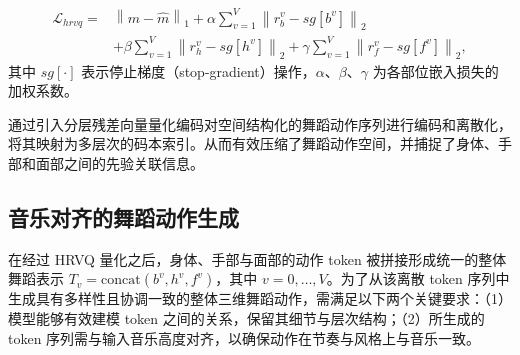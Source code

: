 \begin{equation}
\begin{aligned}
    \mathcal{L}_{hrvq} = & \left \| m - \hat{m} \right \|_1 + \alpha \sum_{v=1}^{V}\left \| r^v_b - sg[b^v] \right \|_2 \\
& + \beta \sum_{v=1}^{V}\left \| r^v_h - sg[h^v] \right \|_2 + \gamma \sum_{v=1}^{V}\left \| r^v_f - sg[f^v] \right \|_2 ,
\end{aligned}
\label{eq:hrvq_loss}
\end{equation}
其中 $sg[\cdot]$ 表示停止梯度（stop-gradient）操作，$\alpha$、$\beta$、$\gamma$ 为各部位嵌入损失的加权系数。

通过引入分层残差向量量化编码对空间结构化的舞蹈动作序列进行编码和离散化，将其映射为多层次的码本索引。从而有效压缩了舞蹈动作空间，并捕捉了身体、手部和面部之间的先验关联信息。

\subsection{音乐对齐的舞蹈动作生成}
\label{subsec:magm}
在经过 HRVQ 量化之后，身体、手部与面部的动作 token 被拼接形成统一的整体舞蹈表示 $T_v = \text{concat}(b^v, h^v, f^v)$，其中 $v=0, \dots, V$。为了从该离散 token 序列中生成具有多样性且协调一致的整体三维舞蹈动作，需满足以下两个关键要求：（1）模型能够有效建模 token 之间的关系，保留其细节与层次结构；（2）所生成的 token 序列需与输入音乐高度对齐，以确保动作在节奏与风格上与音乐一致。

